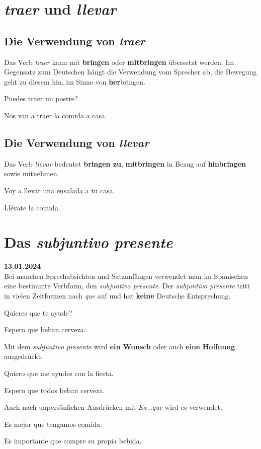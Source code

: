 \section{\textit{traer} und \textit{llevar}}
\subsection*{Die Verwendung von \textit{traer}}
Das Verb \textit{traer} kann mit \textbf{bringen}
oder \textbf{mitbringen} übersetzt werden. Im Gegensatz
zum Deutschen hängt die Verwendung vom Sprecher ab,
die Bewegung geht zu diesem hin, im Sinne von 
\textbf{her}bringen.
\begin{ejemplos}
    \item Puedes traer un postre?
    \item Nos van a traer la comida a casa.
\end{ejemplos}
\subsection*{Die Verwendung von \textit{llevar}}
Das Verb \textit{llevar} bedeutet \textbf{bringen zu},
\textbf{mitbringen} in Bezug auf \textbf{hinbringen} sowie
mitnehmen.
\begin{ejemplos}
    \item Voy a llevar una ensalada a tu casa.
    \item Ll\'evate la comida.
\end{ejemplos}
\section{Das \textit{subjuntivo presente}}
\textbf{13.01.2024}\\
Bei manchen Sprechabsichten und Satzanfängen 
verwendet man im Spanischen eine bestimmte 
Verbform, den \textit{subjuntivo presente}.
Der \textit{subjuntivo presente} tritt in vielen
Zeitformen nach \textit{que} auf und hat 
\textbf{keine} Deutsche Entsprechung.
\begin{ejemplos}
    \item Quieres que te ayude?
    \item Espero que beban cerveza.
\end{ejemplos} 
Mit dem \textit{subjuntivo presente} wird 
\textbf{ein Wunsch} oder auch \textbf{eine Hoffnung}
ausgedrückt.
\begin{ejemplos}
    \item Quiero que me ayudes con la fiesta.
    \item Espero que todos beban cerveza.
\end{ejemplos}
Auch nach unpersönlichen Ausdrücken mit 
\textit{Es...que} wird es verwendet.
\begin{ejemplos}
    \item Es mejor que tengamos comida.
    \item Es importante que compre su propia bebida.
\end{ejemplos}
